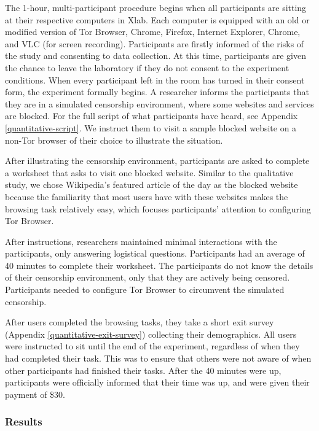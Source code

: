 \documentclass{template}
\begin{document}
The 1-hour, multi-participant procedure begins when all participants are sitting at their
respective computers in Xlab. Each computer is equipped with an old or modified version
of Tor Browser, Chrome, Firefox, Internet Explorer,  Chrome, and VLC (for screen recording). 
Participants are firstly informed of the risks of the study and consenting to data collection.  At
this time, participants are given the chance to leave the laboratory if they do not consent to 
the experiment conditions. When every participant left in the room has turned in their consent
form, the experiment formally begins. A researcher informs the participants that they are in a
simulated censorship environment, where some websites and services are blocked. 
For the full script of what participants have heard, see Appendix \ref{quantitative-script}. We
instruct them to visit a sample blocked website on a non-Tor browser of their choice to illustrate 
the situation.

After illustrating the censorship environment, participants are asked to 
complete a worksheet that asks to visit one blocked website. 
Similar to the qualitative study, we chose Wikipedia's featured article of the day 
as the blocked website because the familiarity 
that most users have with these websites makes the browsing task relatively easy, 
which focuses participants' attention to configuring Tor Browser. 

After instructions, researchers maintained minimal interactions with the participants, 
only answering logistical questions. Participants had an 
average of 40 minutes to complete their worksheet. 
The participants do not know the details of their censorship environment,
only that they are actively being censored. Participants needed to configure Tor Browser to 
circumvent the simulated censorship. 

After users completed the browsing tasks, they take a short exit survey (Appendix \ref{quantitative-exit-survey})
collecting their demographics. All users were instructed to sit until the end of the experiment,
regardless of when they had completed their task. This was to ensure that others were not 
aware of when other participants had finished their tasks. After the 40 minutes were up, 
participants were officially informed that their time was up, and were given their payment of 
\$30. 

\subsubsection{Results}
\end{document}
